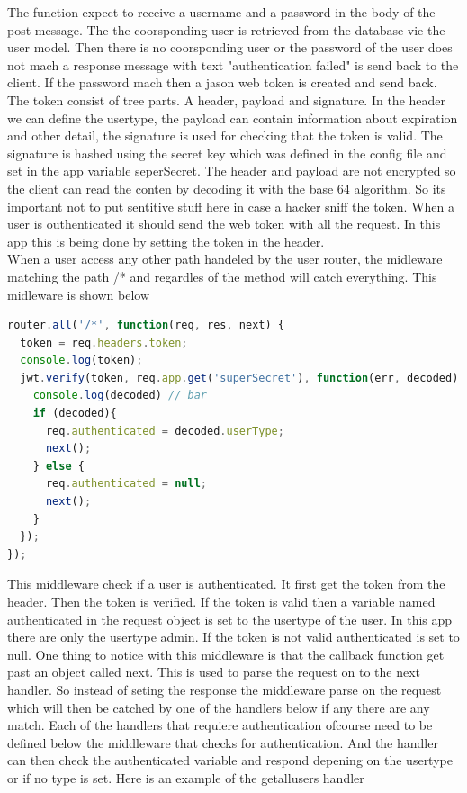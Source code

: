 \documentclass[a4paper,12pt,english]{article}
\begin{document}
The function expect to receive a username and a password in the body of the post message. The the coorsponding user is retrieved from the database vie the user model. Then there is no coorsponding user or the password of the user does not mach a response message with text "authentication failed" is send back to the client. If the password mach then a jason web token is created and send back. The token consist of tree parts. A header, payload and signature. In the header we can define the usertype, the payload can contain information about expiration and other detail, the signature is used for checking that the token is valid. The signature is hashed using the secret key which was defined in the config file and set in the app variable seperSecret. The header and payload are not encrypted so the client can read the conten by decoding it with the base 64 algorithm. So its important not to put sentitive stuff here in case a hacker sniff the token. When a user is outhenticated it should send the web token with all the request. In this app this is being done by setting the token in the header.\\

When a user access any other path handeled by the user router, the midleware matching the path /* and regardles of the method will catch everything. This midleware is shown below

\begin{lstlisting}[language=javascript] 
router.all('/*', function(req, res, next) {
  token = req.headers.token;
  console.log(token);
  jwt.verify(token, req.app.get('superSecret'), function(err, decoded) {
    console.log(decoded) // bar
    if (decoded){
      req.authenticated = decoded.userType;
      next();
    } else {
      req.authenticated = null;
      next();
    }
  });
});
\end{lstlisting}
This middleware check if a user is authenticated. It first get the token from the header. Then the token is verified. If the token is valid then a variable named authenticated in the request object is set to the usertype of the user. In this app there are only the usertype admin. If the token is not valid authenticated is set to null. One thing to notice with this middleware is that the callback function get past an object called next. This is used to parse the request on to the next handler. So instead of seting the response the middleware parse on the request which will then be catched by one of the handlers below if any there are any match. Each of the handlers that requiere authentication ofcourse need to be defined below the middleware that checks for authentication. And the handler can then check the authenticated variable and respond depening on the usertype or if no type is set.
Here is an example of the getallusers handler 
\end{document}
